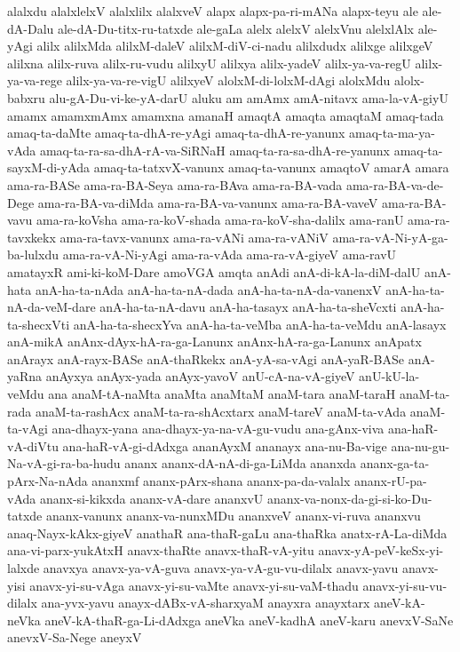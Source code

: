 {alalxdu
alalxlelxV
alalxlilx
alalxveV
alapx
alapx-pa-ri-mANa
alapx-teyu
ale
ale-dA-Dalu
ale-dA-Du-titx-ru-tatxde
ale-gaLa
alelx
alelxV
alelxVnu
alelxlAlx
ale-yAgi
alilx
alilxMda
alilxM-daleV
alilxM-diV-ci-nadu
alilxdudx
alilxge
alilxgeV
alilxna
alilx-ruva
alilx-ru-vudu
alilxyU
alilxya
alilx-yadeV
alilx-ya-va-regU
alilx-ya-va-rege
alilx-ya-va-re-vigU
alilxyeV
alolxM-di-lolxM-dAgi
alolxMdu
alolx-babxru
alu-gA-Du-vi-ke-yA-darU
aluku
am
amAmx
amA-nitavx
ama-la-vA-giyU
amamx
amamxmAmx
amamxna
amanaH
amaqtA
amaqta
amaqtaM
amaq-tada
amaq-ta-daMte
amaq-ta-dhA-re-yAgi
amaq-ta-dhA-re-yanunx
amaq-ta-ma-ya-vAda
amaq-ta-ra-sa-dhA-rA-va-SiRNaH
amaq-ta-ra-sa-dhA-re-yanunx
amaq-ta-sayxM-di-yAda
amaq-ta-tatxvX-vanunx
amaq-ta-vanunx
amaqtoV
amarA
amara
ama-ra-BASe
ama-ra-BA-Seya
ama-ra-BAva
ama-ra-BA-vada
ama-ra-BA-va-de-Dege
ama-ra-BA-va-diMda
ama-ra-BA-va-vanunx
ama-ra-BA-vaveV
ama-ra-BA-vavu
ama-ra-koVsha
ama-ra-koV-shada
ama-ra-koV-sha-dalilx
ama-ranU
ama-ra-tavxkekx
ama-ra-tavx-vanunx
ama-ra-vANi
ama-ra-vANiV
ama-ra-vA-Ni-yA-ga-ba-lulxdu
ama-ra-vA-Ni-yAgi
ama-ra-vAda
ama-ra-vA-giyeV
ama-ravU
amatayxR
ami-ki-koM-Dare
amoVGA
amqta
anAdi
anA-di-kA-la-diM-dalU
anA-hata
anA-ha-ta-nAda
anA-ha-ta-nA-dada
anA-ha-ta-nA-da-vanenxV
anA-ha-ta-nA-da-veM-dare
anA-ha-ta-nA-davu
anA-ha-tasayx
anA-ha-ta-sheVcxti
anA-ha-ta-shecxVti
anA-ha-ta-shecxYva
anA-ha-ta-veMba
anA-ha-ta-veMdu
anA-lasayx
anA-mikA
anAnx-dAyx-hA-ra-ga-Lanunx
anAnx-hA-ra-ga-Lanunx
anApatx
anArayx
anA-rayx-BASe
anA-thaRkekx
anA-yA-sa-vAgi
anA-yaR-BASe
anA-yaRna
anAyxya
anAyx-yada
anAyx-yavoV
anU-cA-na-vA-giyeV
anU-kU-la-veMdu
ana
anaM-tA-naMta
anaMta
anaMtaM
anaM-tara
anaM-taraH
anaM-ta-rada
anaM-ta-rashAcx
anaM-ta-ra-shAcxtarx
anaM-tareV
anaM-ta-vAda
anaM-ta-vAgi
ana-dhayx-yana
ana-dhayx-ya-na-vA-gu-vudu
ana-gAnx-viva
ana-haR-vA-diVtu
ana-haR-vA-gi-dAdxga
ananAyxM
ananayx
ana-nu-Ba-vige
ana-nu-gu-Na-vA-gi-ra-ba-hudu
ananx
ananx-dA-nA-di-ga-LiMda
ananxda
ananx-ga-ta-pArx-Na-nAda
ananxmf
ananx-pArx-shana
ananx-pa-da-valalx
ananx-rU-pa-vAda
ananx-si-kikxda
ananx-vA-dare
ananxvU
ananx-va-nonx-da-gi-si-ko-Du-tatxde
ananx-vanunx
ananx-va-nunxMDu
ananxveV
ananx-vi-ruva
ananxvu
anaq-Nayx-kAkx-giyeV
anathaR
ana-thaR-gaLu
ana-thaRka
anatx-rA-La-diMda
ana-vi-parx-yukAtxH
anavx-thaRte
anavx-thaR-vA-yitu
anavx-yA-peV-keSx-yi-lalxde
anavxya
anavx-ya-vA-guva
anavx-ya-vA-gu-vu-dilalx
anavx-yavu
anavx-yisi
anavx-yi-su-vAga
anavx-yi-su-vaMte
anavx-yi-su-vaM-thadu
anavx-yi-su-vu-dilalx
ana-yvx-yavu
anayx-dABx-vA-sharxyaM
anayxra
anayxtarx
aneV-kA-neVka
aneV-kA-thaR-ga-Li-dAdxga
aneVka
aneV-kadhA
aneV-karu
anevxV-SaNe
anevxV-Sa-Nege
aneyxV
}
